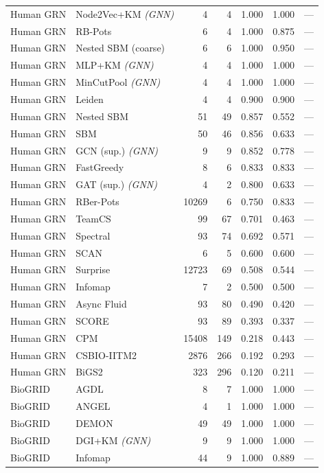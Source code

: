 \begin{longtable}{llrrrrr}
Human GRN & Node2Vec+KM \textit{(GNN)} & 4 & 4 & 1.000 & 1.000 & --- \\
Human GRN & RB-Pots & 6 & 4 & 1.000 & 0.875 & --- \\
Human GRN & Nested SBM (coarse) & 6 & 6 & 1.000 & 0.950 & --- \\
Human GRN & MLP+KM \textit{(GNN)} & 4 & 4 & 1.000 & 1.000 & --- \\
Human GRN & MinCutPool \textit{(GNN)} & 4 & 4 & 1.000 & 1.000 & --- \\
Human GRN & Leiden & 4 & 4 & 0.900 & 0.900 & --- \\
Human GRN & Nested SBM & 51 & 49 & 0.857 & 0.552 & --- \\
Human GRN & SBM & 50 & 46 & 0.856 & 0.633 & --- \\
Human GRN & GCN (sup.) \textit{(GNN)} & 9 & 9 & 0.852 & 0.778 & --- \\
Human GRN & FastGreedy & 8 & 6 & 0.833 & 0.833 & --- \\
Human GRN & GAT (sup.) \textit{(GNN)} & 4 & 2 & 0.800 & 0.633 & --- \\
Human GRN & RBer-Pots & 10269 & 6 & 0.750 & 0.833 & --- \\
Human GRN & TeamCS & 99 & 67 & 0.701 & 0.463 & --- \\
Human GRN & Spectral & 93 & 74 & 0.692 & 0.571 & --- \\
Human GRN & SCAN & 6 & 5 & 0.600 & 0.600 & --- \\
Human GRN & Surprise & 12723 & 69 & 0.508 & 0.544 & --- \\
Human GRN & Infomap & 7 & 2 & 0.500 & 0.500 & --- \\
Human GRN & Async Fluid & 93 & 80 & 0.490 & 0.420 & --- \\
Human GRN & SCORE & 93 & 89 & 0.393 & 0.337 & --- \\
Human GRN & CPM & 15408 & 149 & 0.218 & 0.443 & --- \\
Human GRN & CSBIO-IITM2 & 2876 & 266 & 0.192 & 0.293 & --- \\
Human GRN & BiGS2 & 323 & 296 & 0.120 & 0.211 & --- \\
\midrule
BioGRID & AGDL & 8 & 7 & 1.000 & 1.000 & --- \\
BioGRID & ANGEL & 4 & 1 & 1.000 & 1.000 & --- \\
BioGRID & DEMON & 49 & 49 & 1.000 & 1.000 & --- \\
BioGRID & DGI+KM \textit{(GNN)} & 9 & 9 & 1.000 & 1.000 & --- \\
BioGRID & Infomap & 44 & 9 & 1.000 & 0.889 & --- \\

\end{longtable}
